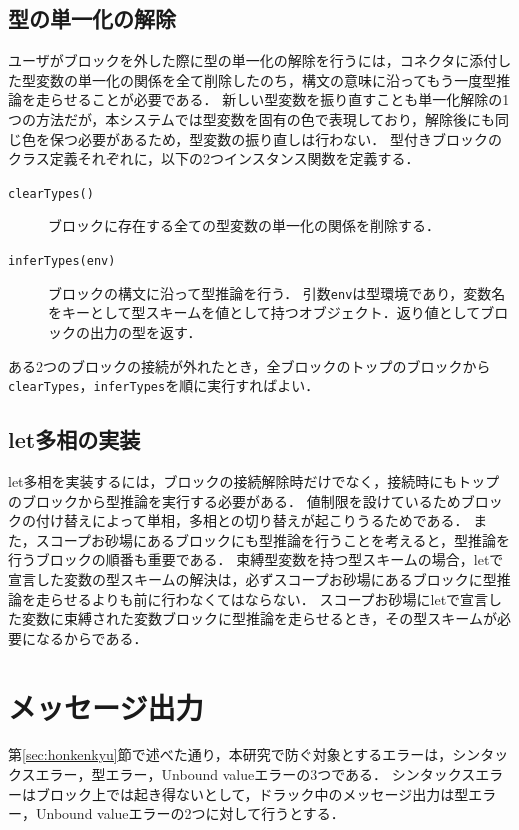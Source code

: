 \subsection*{型の単一化の解除}
ユーザがブロックを外した際に型の単一化の解除を行うには，コネクタに添付した型変数の単一化の関係を全て削除したのち，構文の意味に沿ってもう一度型推論を走らせることが必要である．
新しい型変数を振り直すことも単一化解除の1つの方法だが，本システムでは型変数を固有の色で表現しており，解除後にも同じ色を保つ必要があるため，型変数の振り直しは行わない．
型付きブロックのクラス定義それぞれに，以下の2つインスタンス関数を定義する．
\begin{description}
 \item[{\tt clearTypes()}] ブロックに存在する全ての型変数の単一化の関係を削除する．
 \item[{\tt inferTypes(env)}] ブロックの構文に沿って型推論を行う．
引数{\tt env}は型環境であり，変数名をキーとして型スキームを値として持つオブジェクト．返り値としてブロックの出力の型を返す．
\end{description}

ある2つのブロックの接続が外れたとき，全ブロックのトップのブロックから{\tt clearTypes}，{\tt inferTypes}を順に実行すればよい．

\subsection*{let多相の実装} %
let多相を実装するには，ブロックの接続解除時だけでなく，接続時にもトップのブロックから型推論を実行する必要がある．
値制限を設けているためブロックの付け替えによって単相，多相との切り替えが起こりうるためである．
また，スコープお砂場にあるブロックにも型推論を行うことを考えると，型推論を行うブロックの順番も重要である．
束縛型変数を持つ型スキームの場合，letで宣言した変数の型スキームの解決は，必ずスコープお砂場にあるブロックに型推論を走らせるよりも前に行わなくてはならない．
スコープお砂場にletで宣言した変数に束縛された変数ブロックに型推論を走らせるとき，その型スキームが必要になるからである．

\section {メッセージ出力}

第\ref{sec:honkenkyu}節で述べた通り，本研究で防ぐ対象とするエラーは，シンタックスエラー，型エラー，Unbound valueエラーの3つである．
シンタックスエラーはブロック上では起き得ないとして，ドラック中のメッセージ出力は型エラー，Unbound valueエラーの2つに対して行うとする．

